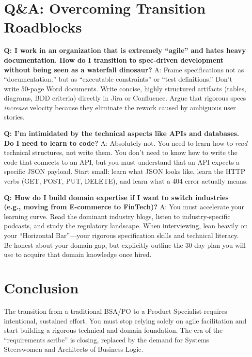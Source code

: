 \documentclass[
  11pt,
  openany,
  oneside]{book}
\begin{document}
\section{Q\&A: Overcoming Transition
Roadblocks}\label{qa-overcoming-transition-roadblocks}

\textbf{Q: I work in an organization that is extremely ``agile'' and
hates heavy documentation. How do I transition to spec-driven
development without being seen as a waterfall dinosaur?} A: Frame
specifications not as ``documentation,'' but as ``executable
constraints'' or ``test definitions.'' Don't write 50-page Word
documents. Write concise, highly structured artifacts (tables, diagrams,
BDD criteria) directly in Jira or Confluence. Argue that rigorous specs
\emph{increase} velocity because they eliminate the rework caused by
ambiguous user stories.

\textbf{Q: I'm intimidated by the technical aspects like APIs and
databases. Do I need to learn to code?} A: Absolutely not. You need to
learn how to \emph{read} technical structures, not write them. You don't
need to know how to write the code that connects to an API, but you must
understand that an API expects a specific JSON payload. Start small:
learn what JSON looks like, learn the HTTP verbs (GET, POST, PUT,
DELETE), and learn what a 404 error actually means.

\textbf{Q: How do I build domain expertise if I want to switch
industries (e.g., moving from E-commerce to FinTech)?} A: You must
accelerate your learning curve. Read the dominant industry blogs, listen
to industry-specific podcasts, and study the regulatory landscape. When
interviewing, lean heavily on your ``Horizontal Bar''---your rigorous
specification skills and technical literacy. Be honest about your domain
gap, but explicitly outline the 30-day plan you will use to acquire that
domain knowledge once hired.

\bigskip

\section{Conclusion}\label{conclusion-1}

The transition from a traditional BSA/PO to a Product Specialist
requires intentional, sustained effort. You must stop relying solely on
agile facilitation and start building a rigorous technical and domain
foundation. The era of the ``requirements scribe'' is closing, replaced
by the demand for Systems Steerswomen and Architects of Business Logic.
\end{document}
